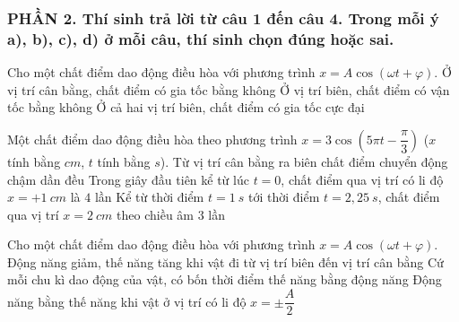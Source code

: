 \subsubsection*{PHẦN 2. Thí sinh trả lời từ câu 1 đến câu 4. Trong mỗi ý a), b), c), d) ở mỗi câu, thí sinh chọn đúng hoặc sai.}
\setcounter{ex}{0}
\begin{ex}
	Cho một chất điểm dao động điều hòa với phương trình $x=A\cos(\omega t + \varphi)$.
	{\True Ở vị trí cân bằng, chất điểm có gia tốc bằng không}
	{\True Ở vị trí biên, chất điểm có vận tốc bằng không}
	{Ở cả hai vị trí biên, chất điểm có gia tốc cực đại}
\end{ex}
\begin{ex}
	Một chất điểm dao động điều hòa theo phương trình $x=3 \cos \left(5 \pi t-\dfrac{\pi}{3}\right)$ ($x$ tính bằng $cm$, $t$ tính bằng $s$).
	{Từ vị trí cân bằng ra biên chất điểm chuyển động chậm dần đều}
	{Trong giây đầu tiên kể từ lúc $t=0$, chất điểm qua vị trí có li độ $x=+1 \ cm$ là $4$ lần}
	{\True Kể từ thời điểm $t=1 \ s$ tới thời điểm $t=2,25 \ s$, chất điểm qua vị trí $x=2 \ cm$ theo chiều âm $3$ lần} 
\end{ex}
\begin{ex}
	Cho một chất điểm dao động điều hòa với phương trình $x=A\cos(\omega t + \varphi)$.
	{Động năng giảm, thế năng tăng khi vật đi từ vị trí biên đến vị trí cân bằng}
	{\True Cứ mỗi chu kì dao động của vật, có bốn thời điểm thế năng bằng động năng}
	{Động năng bằng thế năng khi vật ở vị trí có li độ $x=\pm \dfrac{A}{2}$}
	
\end{ex}
